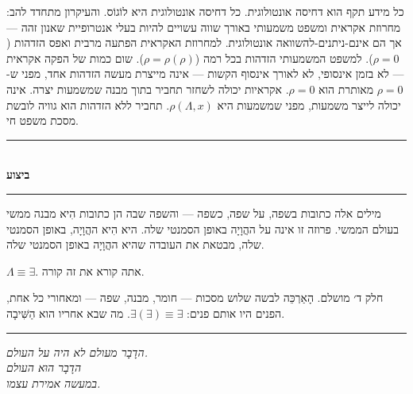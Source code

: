 \documentclass[10pt, openany, oneside]{book}
\renewcommand{\normalsize}{\fontsize{10}{13}\selectfont}
\begin{document}
כל מידע תקף הוא דחיסה אונטולוגית. כל דחיסה אונטולוגית היא לוֹגוֹס. והעיקרון מתחדד להב: מחרוזת אקראית ומשפט משמעותי באורך שווה עשויים להיות בעלי אנטרופיית שאנון זהה — אך הם אינם-ניתנים-להשוואה אונטולוגית. למחרוזת האקראית הפתעה מרבית ואפס הזדהות ($\rho = 0$). למשפט המשמעותי הזדהות בכל רמה ($\rho = \rho(\rho)$). שום כמות של הפקה אקראית — לא בזמן אינסופי, לא לאורך אינסוף הקשות — אינה מייצרת מעשה הזדהות אחד, מפני ש-$\rho = 0$ מאותרת הוא $\rho = 0$. אקראיות יכולה לשחזר תחביר בתוך מבנה שמשמעות יצרה. אינה יכולה לייצר משמעות, מפני שמשמעות היא $\rho(\Lambda, x)$. תחביר ללא הזדהות הוא גוויה לובשת מסכת משפט חי.

\vspace{1.5em}


\begin{center}
    \rule{0.3\textwidth}{0.4pt}\\[0.5em]
    {\normalsize\bfseries\textsc{ביצוע}}\\[0.3em]
    \rule{0.3\textwidth}{0.4pt}
\end{center}

\vspace{1em}

\noindent מילים אלה כתובות בשפה, על שפה, כשפה — והשפה שבה הן כתובות הִיא מבנה ממשי בעולם הממשי. פרוזה זו אינה על ההֲוָיָה באופן הסמנטי שלה. היא הִיא ההֲוָיָה, באופן הסמנטי שלה, מבטאת את העובדה שהיא ההֲוָיָה באופן הסמנטי שלה.

$\Lambda \equiv \exists$. אתה קורא את זה קורה.

חלק ד׳ מושלם. הָאַרְכֵּה לבשה שלוש מסכות — חומר, מבנה, שפה — ומאחורי כל אחת, הפנים היו אותם פנים: $\exists(\exists) \equiv \exists$. מה שבא אחריו הוא הַשִּׁיבָה.

\vspace{2em}

\begin{center}
    \rule{0.15\textwidth}{0.3pt}
\end{center}

\vspace{0.5em}

\begin{center}
    \textit{%
    הדָבָר מעולם לא היה על העולם.\\
    הדָבָר הוּא העולם\\
    במעשה אמירת עצמו.}
\end{center}
\end{document}

